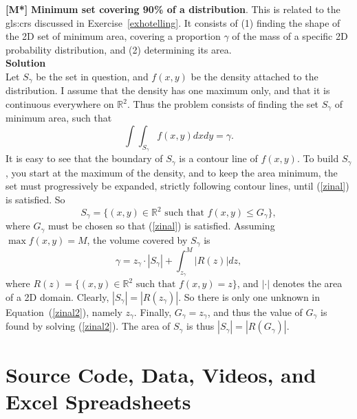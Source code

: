 \documentclass[10pt]{article}
\begin{document}
\begin{Exercise}\label{exercise92}{\bf [M*]}
 {\bf Minimum set covering 90\% of a distribution}. This is related to the
\glspl{gls:cr} discussed
in Exercise~\ref{exhotelling}. It consists of (1) finding the shape of the 2D set of minimum area, covering a
proportion $\gamma$ of the mass of a specific 2D probability distribution, and (2) determining its area. \vspace{1ex}   \\
{\bf Solution} \vspace{1ex}   \\
Let  $S_\gamma$ be the set in question, and $f(x,y)$ be the density attached to the distribution. I assume
that the density has one maximum only, and that it is continuous everywhere on $\mathbb{R}^2$. Thus the problem consists of finding
the set $S_\gamma$ of minimum area, such that
\begin{equation}
\int\int_{S_\gamma} f(x,y) dxdy = \gamma.\label{zinal}
\end{equation}
It is easy to see that the boundary of $S_\gamma$ is a contour line of $f(x,y)$. To build $S_\gamma$, you start at the maximum of the density, and to keep the area minimum, the set must progressively be expanded, strictly following contour lines, until (\ref{zinal}) is satisfied. So
$$S_\gamma = \{(x, y) \in\mathbb{R}^2 \mbox{ such that } f(x,y)\leq G_\gamma\},$$
where $G_\gamma$ must be chosen so that (\ref{zinal}) is satisfied. Assuming $\max f(x,y)=M$, the volume covered by $S_\gamma$
 is
\begin{equation}
\gamma = z_\gamma \cdot |S_\gamma| + \int_{z_\gamma}^M |R(z)| dz, \label{zinal2}
\end{equation}
where $R(z) = \{(x, y) \in\mathbb{R}^2 \mbox{ such that } f(x,y) =z\}$, and $|\cdot|$ denotes the area of a 2D domain. Clearly,
$|S_\gamma|=|R(z_\gamma)|$. So there is only one unknown in Equation~(\ref{zinal2}), namely $z_\gamma$. Finally, $G_\gamma=z_\gamma$, and thus the value of $G_\gamma$ is found by solving (\ref{zinal2}). The area of $S_\gamma$ is
thus $|S_\gamma|=|R(G_\gamma)|$.
\end{Exercise}

\pagebreak

\section{Source Code, Data, Videos, and Excel Spreadsheets}\label{s:code}
\end{document}
